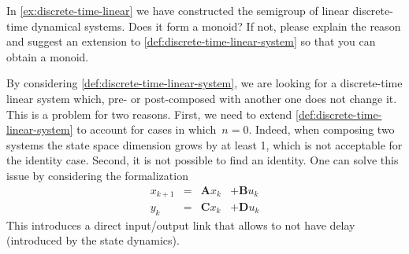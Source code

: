\begin{exercise}
    In \cref{ex:discrete-time-linear} we have constructed the semigroup of linear discrete-time dynamical systems.
    Does it form a monoid? If not, please explain the reason and suggest an extension to \cref{def:discrete-time-linear-system} so that you can obtain a monoid.
\end{exercise}
\begin{solution}
    By considering \cref{def:discrete-time-linear-system}, we are looking for a discrete-time linear system which, pre- or post-composed with another one does not change it.
    This is a problem for two reasons.
    First, we need to extend \cref{def:discrete-time-linear-system} to account for cases in which~$n=0$.
    Indeed, when composing two systems the state space dimension grows by at least 1, which is not acceptable for the identity case.
    Second, it is not possible to find an identity.
    One can solve this issue by considering the formalization
    \begin{equation}
        \label{eq:discrete-time-dynamics-D}
        \begin{aligned}
            x_{k+1} &=& \mathbf{A} x_k & + \mathbf{B} u_k \\
            y_{k}   &=& \mathbf{C} x_k & + \mathbf{D} u_k
        \end{aligned}
    \end{equation}
    This introduces a direct input/output link that allows to not have delay (introduced by the state dynamics).
\end{solution}
